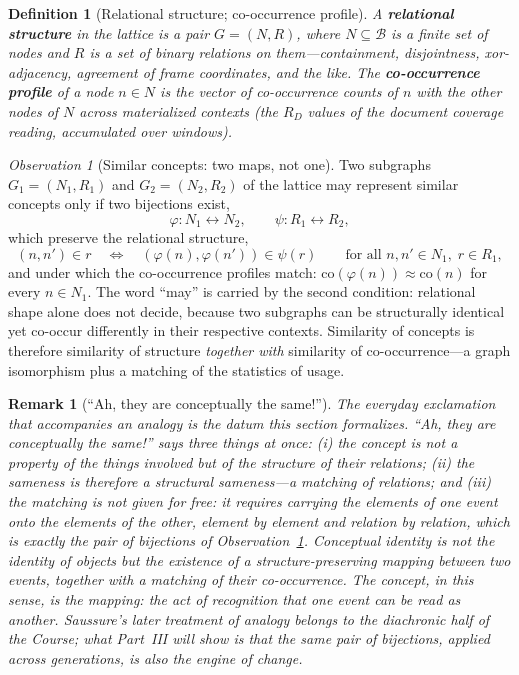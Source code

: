 \documentclass[11pt,a4paper]{article}
\newtheorem{definition}[principle]{Definition}
\newtheorem{remark}[principle]{Remark}
\theoremstyle{remark}
\newtheorem{observation}[principle]{Observation}
\newcommand{\Lat}{\ensuremath{\mathcal{B}}}              %
\begin{document}
\begin{definition}[Relational structure; co-occurrence profile]
\label{def:relational}
A \textbf{relational structure} in the lattice is a pair $G = (N, R)$, where
$N \subseteq \Lat$ is a finite set of nodes and $R$ is a set of binary
relations on them---containment, disjointness, xor-adjacency, agreement of
frame coordinates, and the like. The \textbf{co-occurrence profile} of a node
$n \in N$ is the vector of co-occurrence counts of $n$ with the other nodes
of $N$ across materialized contexts (the $R_D$ values of the document
coverage reading, accumulated over windows).
\end{definition}

\begin{observation}[Similar concepts: two maps, not one]
\label{obs:similar-concepts}
Two subgraphs $G_1 = (N_1, R_1)$ and $G_2 = (N_2, R_2)$ of the lattice may
represent similar concepts only if two bijections exist,
\[
  \varphi : N_1 \leftrightarrow N_2,
  \qquad
  \psi : R_1 \leftrightarrow R_2,
\]
which preserve the relational structure,
\[
  (n, n') \in r
  \quad\Longleftrightarrow\quad
  (\varphi(n), \varphi(n')) \in \psi(r)
  \qquad
  \text{for all } n, n' \in N_1,\; r \in R_1,
\]
and under which the co-occurrence profiles match:
$\mathrm{co}(\varphi(n)) \approx \mathrm{co}(n)$ for every $n \in N_1$. The
word ``may'' is carried by the second condition: relational shape alone does
not decide, because two subgraphs can be structurally identical yet co-occur
differently in their respective contexts. Similarity of concepts is therefore
similarity of structure \emph{together with} similarity of co-occurrence---a
graph isomorphism plus a matching of the statistics of usage.
\end{observation}

\begin{remark}[``Ah, they are conceptually the same!'']
\label{rem:aha}
The everyday exclamation that accompanies an analogy is the datum this
section formalizes. ``Ah, they are conceptually the same!'' says three things
at once: (i) the concept is not a property of the things involved but of the
structure of their relations; (ii) the sameness is therefore a structural
sameness---a matching of relations; and (iii) the matching is not given for
free: it requires carrying the elements of one event onto the elements of the
other, element by element and relation by relation, which is exactly the pair
of bijections of Observation~\ref{obs:similar-concepts}. Conceptual identity
is not the identity of objects but the existence of a structure-preserving
mapping between two events, together with a matching of their co-occurrence.
The concept, in this sense, \emph{is} the mapping: the act of recognition
that one event can be read as another. Saussure's later treatment of analogy
belongs to the diachronic half of the \textit{Course}; what Part~III will
show is that the same pair of bijections, applied across generations, is also
the engine of change.

\end{remark}
\end{document}
